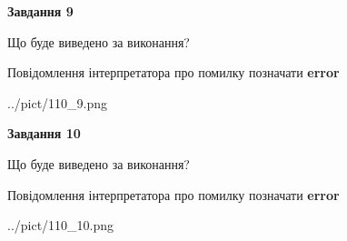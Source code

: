 \documentclass[12pt, ukrainian]{article}
\begin{document}
{{\begin {center}\textbf{Завдання 9}\end {center}}\par
Що буде виведено за виконання? \par
Повідомлення інтерпретатора про помилку позначати \textbf{error}

\begin{center}
	{../pict/110_9.png}
\end{center}
\newpage

{\begin {center}\textbf{Завдання 10}\end {center}}\par
Що буде виведено за виконання? \par
Повідомлення інтерпретатора про помилку позначати \textbf{error}

\begin{center}
	{../pict/110_10.png}
\end{center}
\newpage

}
\end{document}
